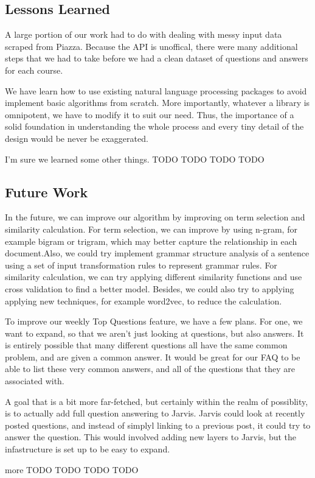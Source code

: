 \documentclass[sigconf]{acmart}
\begin{document}
\subsection{Lessons Learned}
A large portion of our work had to do with dealing with messy input data scraped from Piazza. Because the API is unoffical, there were many additional steps that we had to take before we had a clean dataset of questions and answers for each course. 

We have learn how to use existing natural language processing packages to avoid implement basic algorithms from scratch. More importantly, whatever a library is omnipotent, we have to modify it to suit our need. Thus, the importance of a solid foundation in understanding the whole process and every tiny detail of the design would be never be exaggerated. 

I'm sure we learned some other things. 
TODO TODO TODO TODO

\subsection{Future Work}
In the future, we can improve our algorithm by improving on term selection and similarity calculation. For term selection, we can improve by using n-gram, for example bigram or trigram, which may better capture the relationship in each document.Also, we could try implement  grammar structure analysis of a sentence using a set of input transformation rules to represent grammar rules. For similarity calculation, we can try applying different similarity functions and use cross validation to find a better model. Besides, we could also try to applying applying new techniques, for example word2vec, to reduce the calculation.

To improve our weekly Top Questions feature, we have a few plans. For one, we want to expand, so that we aren't just looking at questions, but also answers. It is entirely possible that many different questions all have the same common problem, and are given a common answer. It would be great for our FAQ to be able to list these very common answers, and all of the questions that they are associated with.

A goal that is a bit more far-fetched, but certainly within the realm of possiblity, is to actually add full question answering to Jarvis. Jarvis could look at recently posted questions, and instead of simplyl linking to a previous post, it could try to answer the question. This would involved adding new layers to Jarvis, but the infastructure is set up to be easy to expand.

more TODO TODO TODO TODO




 
\end{document}
